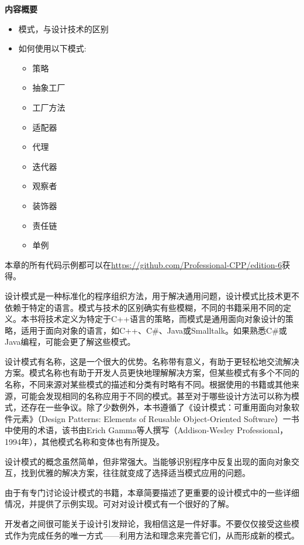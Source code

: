 \noindent
\textbf{内容概要}

\begin{itemize}
\item
模式，与设计技术的区别

\item
如何使用以下模式:

\begin{itemize}
\item
策略

\item
抽象工厂

\item
工厂方法

\item
适配器

\item
代理

\item
迭代器

\item
观察者

\item
装饰器

\item
责任链

\item
单例
\end{itemize}
\end{itemize}

本章的所有代码示例都可以在\url{https://github.com/Professional-CPP/edition-6}获得。

设计模式是一种标准化的程序组织方法，用于解决通用问题，设计模式比技术更不依赖于特定的语言。模式与技术的区别确实有些模糊，不同的书籍采用不同的定义。本书将技术定义为特定于C++语言的策略，而模式是通用面向对象设计的策略，适用于面向对象的语言，如C++、C\#、Java或Smalltalk。如果熟悉C\#或Java编程，可能会更了解这些模式。

设计模式有名称，这是一个很大的优势。名称带有意义，有助于更轻松地交流解决方案。模式名称也有助于开发人员更快地理解解决方案，但某些模式有多个不同的名称，不同来源对某些模式的描述和分类有时略有不同。根据使用的书籍或其他来源，可能会发现相同的名称应用于不同的模式。甚至对于哪些设计方法可以称为模式，还存在一些争议。除了少数例外，本书遵循了《设计模式：可重用面向对象软件元素》（Design Patterns: Elements of Reusable Object-Oriented Software）一书中使用的术语，该书由Erich Gamma等人撰写（Addison-Wesley Professional，1994年），其他模式名称和变体也有所提及。

设计模式的概念虽然简单，但非常强大。当能够识别程序中反复出现的面向对象交互，找到优雅的解决方案，往往就变成了选择适当模式应用的问题。

由于有专门讨论设计模式的书籍，本章简要描述了更重要的设计模式中的一些详细情况，并提供了示例实现。可对对设计模式有一个很好的了解。

开发者之间很可能关于设计引发辩论，我相信这是一件好事。不要仅仅接受这些模式作为完成任务的唯一方式——利用方法和理念来完善它们，从而形成新的模式。









